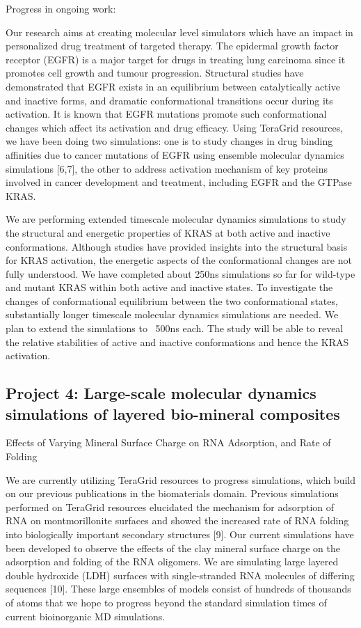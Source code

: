 \documentclass[a4paper,10pt]{article}
\begin{document}
Progress in ongoing work:

Our research aims at creating molecular level simulators which have an impact in personalized drug treatment of targeted therapy. The epidermal growth factor receptor (EGFR) is a major target for drugs in treating lung carcinoma since it promotes cell growth and tumour progression. Structural studies have demonstrated that EGFR exists in an equilibrium between catalytically active and inactive forms, and dramatic conformational transitions occur during its activation. It is known that EGFR mutations promote such conformational changes which affect its activation and drug efficacy. Using TeraGrid resources, we have been doing two simulations: one is to study changes in drug binding affinities due to cancer mutations of EGFR using ensemble molecular dynamics simulations [6,7], the other to address activation mechanism of key proteins involved in cancer development and treatment, including EGFR and the GTPase KRAS.

We are performing extended timescale molecular dynamics simulations to study the structural and energetic properties of KRAS at both active and inactive conformations. Although studies have provided insights into the structural basis for KRAS activation, the energetic aspects of the conformational changes are not fully understood. We have completed about 250ns simulations so far for wild-type and mutant KRAS within both active and inactive states. To investigate the changes of conformational equilibrium between the two conformational states, substantially longer timescale molecular dynamics simulations are needed. We plan to extend the simulations to ~500ns each. The study will be able to reveal the relative stabilities of active and inactive conformations and hence the KRAS activation.


\subsection{Project 4: Large-scale molecular dynamics simulations of layered bio-mineral composites}


Effects of Varying Mineral Surface Charge on RNA Adsorption, and Rate of Folding

We are currently utilizing TeraGrid resources to progress simulations, which build on our previous publications in the biomaterials domain. Previous simulations performed on TeraGrid resources elucidated the mechanism for adsorption of RNA on montmorillonite surfaces and showed the increased rate of RNA folding into biologically important secondary structures [9]. Our current simulations have been developed to observe the effects of the clay mineral surface charge on the adsorption and folding of the RNA oligomers. We are simulating large layered double hydroxide (LDH) surfaces with single-stranded RNA molecules of differing sequences [10]. These large ensembles of models consist of hundreds of thousands of atoms that we hope to progress beyond the standard simulation times of current bioinorganic MD simulations.
\end{document}
